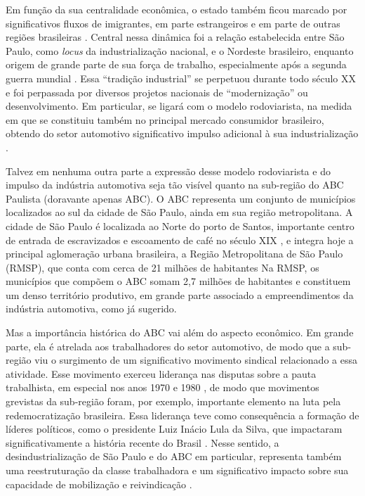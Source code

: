 Em função da sua centralidade econômica, o estado também ficou marcado
por significativos fluxos de imigrantes, em parte estrangeiros e em
parte de outras regiões brasileiras
\citep{lanza_cafe_2014}. Central nessa dinâmica foi a relação estabelecida entre São
Paulo, como \emph{locus} da industrialização nacional, e o Nordeste
brasileiro, enquanto origem de grande parte de sua força de trabalho,
especialmente após a segunda guerra mundial
\citep{fontes_um_2008}. Essa
``tradição industrial'' se perpetuou durante todo século XX e foi
perpassada por diversos projetos nacionais de ``modernização'' ou
desenvolvimento. Em particular, se ligará com o modelo rodoviarista, na
medida em que se constituiu também no principal mercado consumidor
brasileiro, obtendo do setor automotivo significativo impulso adicional
à sua industrialização
\citep{dulci2021}.

Talvez em nenhuma outra parte a expressão desse modelo rodoviarista e do
impulso da indústria automotiva seja tão visível quanto na sub-região do
ABC Paulista (doravante apenas ABC). O ABC representa um conjunto de
municípios localizados ao sul da cidade de São Paulo, ainda em sua
região metropolitana. A cidade de São Paulo é localizada ao Norte do
porto de Santos, importante centro de entrada de escravizados e
escoamento de café no século XIX
\citep{lanna_casas_2019}, e
integra hoje a principal aglomeração urbana brasileira, a Região
Metropolitana de São Paulo (RMSP), que conta com cerca de 21 milhões de
habitantes \citep{governoestadosp_sd} Na RMSP, os municípios que compõem o
ABC somam 2,7 milhões de habitantes
\citep{consorcioabc2024}
e constituem um denso território produtivo, em grande parte associado a
empreendimentos da indústria automotiva, como já sugerido.

Mas a importância histórica do ABC vai além do aspecto econômico. Em
grande parte, ela é atrelada aos trabalhadores do setor automotivo, de
modo que a sub-região viu o surgimento de um significativo movimento
sindical relacionado a essa atividade. Esse movimento exerceu liderança
nas disputas sobre a pauta trabalhista, em especial nos anos 1970 e 1980
\citep{ramalhorodrigues2013,ramalhorodrigues2018}, de modo que movimentos grevistas da sub-região foram, por
exemplo, importante elemento na luta pela redemocratização brasileira.
Essa liderança teve como consequência a formação de líderes políticos,
como o presidente Luiz Inácio Lula da Silva, que impactaram
significativamente a história recente do Brasil
\citep{ramalhorodrigues2018}. Nesse sentido, a desindustrialização de São Paulo e do ABC em
particular, representa também uma reestruturação da classe trabalhadora
e um significativo impacto sobre sua capacidade de mobilização e
reivindicação \citep{fontes2023}.

